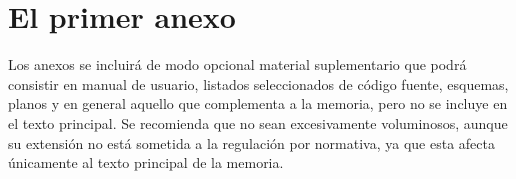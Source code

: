 \chapter{El primer anexo}
\label{cap:AnexoA}

Los anexos se incluirá de modo opcional material suplementario que podrá consistir en manual de usuario, listados seleccionados de código fuente, esquemas, planos y en general aquello que complementa a la memoria, pero no se incluye en el texto principal. Se recomienda que no sean excesivamente voluminosos, aunque su extensión no está sometida a la regulación por normativa, ya que esta afecta únicamente al texto principal de la memoria.






